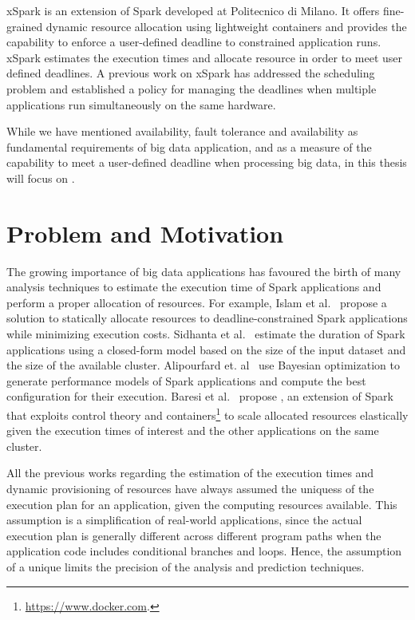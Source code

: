 xSpark is an extension of Spark developed at Politecnico di Milano. It offers fine-grained dynamic resource allocation using lightweight containers and provides the capability to  enforce a user-defined deadline to \qos constrained application runs. xSpark estimates the execution times and allocate resource in order to meet user defined deadlines. A previous work on xSpark has addressed the scheduling problem and established a policy for managing the deadlines when multiple applications run simultaneously on the same hardware.

While we have mentioned availability, fault tolerance and availability as fundamental requirements of big data application, and \qos as a measure of the capability to meet a user-defined deadline when processing big data, in this thesis will focus on \qos.

\section{Problem and Motivation}\label{sec:problem_motivation}
The growing importance of big data applications has favoured the birth of many analysis techniques to estimate the execution time of Spark applications and perform a proper allocation of resources. For example, Islam et al.~\cite{dSpark} propose a solution to statically allocate resources to deadline-constrained Spark applications while minimizing execution costs. Sidhanta et al.~\cite{Sidhanta2016} estimate the duration of Spark applications using a closed-form model based on the size of the input dataset and the size of the available cluster. Alipourfard et. al~\cite{Alipourfard} use Bayesian optimization to generate performance models of Spark applications and compute the best configuration for their execution.  Baresi et al.~\cite{xsparkreport, Quattrocchi2018} propose \cSpark, an extension of Spark that exploits control theory and containers\footnote{\url{https://www.docker.com}.} to scale allocated resources elastically given the execution times of interest and the other applications  on the same cluster.

All the previous works regarding the estimation of the execution times and dynamic provisioning of resources have always assumed the uniquess of the execution plan for an application, given the computing resources available. This assumption is a simplification of real-world applications, since the actual execution plan is generally different across different program paths when the application code includes conditional branches and loops. Hence, the assumption of a unique \plan limits the precision of the analysis and prediction techniques.


